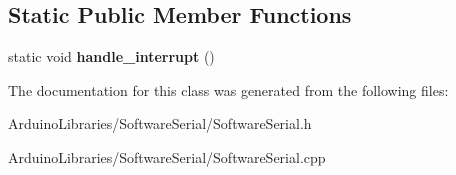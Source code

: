\subsection*{Static Public Member Functions}
\begin{DoxyCompactItemize}
\item 
\hypertarget{class_software_serial_a1546972033f250750ffd731dd15acfdf}{}static void {\bfseries handle\+\_\+interrupt} ()\label{class_software_serial_a1546972033f250750ffd731dd15acfdf}

\end{DoxyCompactItemize}


The documentation for this class was generated from the following files\+:\begin{DoxyCompactItemize}
\item 
Arduino\+Libraries/\+Software\+Serial/Software\+Serial.\+h\item 
Arduino\+Libraries/\+Software\+Serial/Software\+Serial.\+cpp\end{DoxyCompactItemize}
